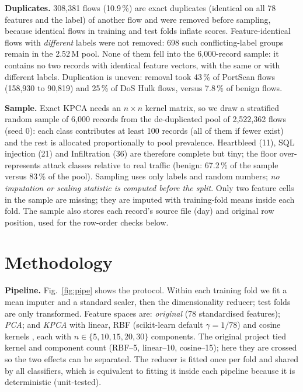 \documentclass[conference]{IEEEtran}
\newcommand{\tabsize}{\footnotesize}
\begin{document}
\textbf{Duplicates.} 308{,}381 flows (10.9\,\%) are exact duplicates (identical on all 78 features and the label) of another flow and were removed before sampling, because identical flows in training and test folds inflate scores. Feature-identical flows with \emph{different} labels were not removed: 698 such conflicting-label groups remain in the 2.52\,M pool. None of them fell into the 6{,}000-record sample: it contains no two records with identical feature vectors, with the same or with different labels. Duplication is uneven: removal took 43\,\% of PortScan flows (158{,}930 to 90{,}819) and 25\,\% of DoS Hulk flows, versus 7.8\,\% of benign flows.

\textbf{Sample.} Exact KPCA needs an $n\times n$ kernel matrix, so we draw a stratified random sample of 6{,}000 records from the de-duplicated pool of 2{,}522{,}362 flows (seed 0): each class contributes at least 100 records (all of them if fewer exist) and the rest is allocated proportionally to pool prevalence. Heartbleed (11), SQL injection (21) and Infiltration (36) are therefore complete but tiny; the floor over-represents attack classes relative to real traffic (benign: 67.2\,\% of the sample versus 83\,\% of the pool). Sampling uses only labels and random numbers; \emph{no imputation or scaling statistic is computed before the split}. Only two feature cells in the sample are missing; they are imputed with training-fold means inside each fold. The sample also stores each record's source file (day) and original row position, used for the row-order checks below.

\begin{table}[t]
\caption{Class distribution of the 6{,}000-record sample.}\label{tab:classes}
\centering\tabsize

\end{table}

\section{Methodology}\label{sec:method}
\textbf{Pipeline.} Fig.~\ref{fig:pipe} shows the protocol. Within each training fold we fit a mean imputer and a standard scaler, then the dimensionality reducer; test folds are only transformed. Feature spaces are: \emph{original} (78 standardised features); \emph{PCA}; and \emph{KPCA} with linear, RBF (scikit-learn default $\gamma=1/78$) and cosine kernels \cite{scholkopf1998}, each with $n\in\{5,10,15,20,30\}$ components. The original project tied kernel and component count (RBF--5, linear--10, cosine--15); here they are crossed so the two effects can be separated. The reducer is fitted once per fold and shared by all classifiers, which is equivalent to fitting it inside each pipeline because it is deterministic (unit-tested).
\end{document}
